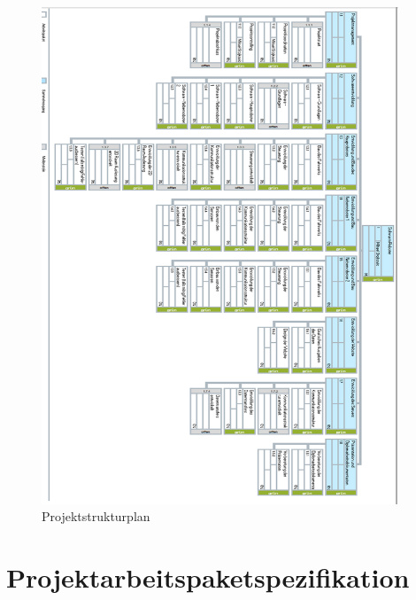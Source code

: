 \begin{figure}[H]
    \centering
    \includegraphics[width=0.95\textwidth]{img/Projektstrukturplan.png}
    \caption{Projektstrukturplan}
    \label{fig:psp}
\end{figure}

\newpage

\section{Projektarbeitspaketspezifikation}

